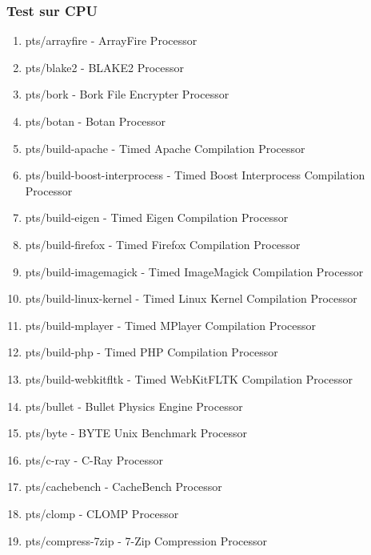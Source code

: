\documentclass[french]{article}
\begin{document}
\subsubsection{Test sur CPU}
\begin{enumerate}
\item pts/arrayfire                  - ArrayFire                           Processor
\item pts/blake2                     - BLAKE2                              Processor
\item pts/bork                       - Bork File Encrypter                 Processor
\item pts/botan                      - Botan                               Processor
\item pts/build-apache               - Timed Apache Compilation            Processor
\item pts/build-boost-interprocess   - Timed Boost Interprocess Compilation Processor
\item pts/build-eigen                - Timed Eigen Compilation             Processor
\item pts/build-firefox              - Timed Firefox Compilation           Processor
\item pts/build-imagemagick          - Timed ImageMagick Compilation       Processor
\item pts/build-linux-kernel         - Timed Linux Kernel Compilation      Processor
\item pts/build-mplayer              - Timed MPlayer Compilation           Processor
\item pts/build-php                  - Timed PHP Compilation               Processor
\item pts/build-webkitfltk           - Timed WebKitFLTK Compilation        Processor
\item pts/bullet                     - Bullet Physics Engine               Processor
\item pts/byte                       - BYTE Unix Benchmark                 Processor
\item pts/c-ray                      - C-Ray                               Processor
\item pts/cachebench                 - CacheBench                          Processor
\item pts/clomp                      - CLOMP                               Processor
\item pts/compress-7zip              - 7-Zip Compression                   Processor

\end{enumerate}
\end{document}
